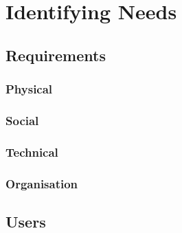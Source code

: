 
\section{Identifying Needs}
\subsection{Requirements}

\subsubsection{Physical}

\subsubsection{Social}

\subsubsection{Technical}

\subsubsection{Organisation}

\subsection{Users}